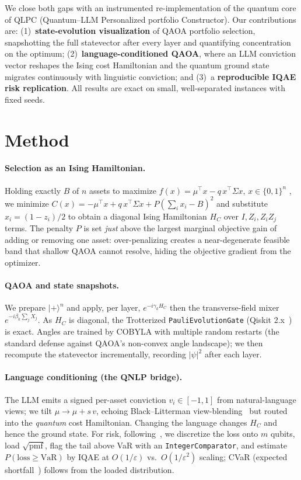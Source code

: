 \documentclass[runningheads]{llncs}
\begin{document}
We close both gaps with an instrumented re-implementation of the quantum core of QLPC (Quantum--LLM
Personalized portfolio Constructor). Our contributions are: (1)~\textbf{state-evolution visualization} of
QAOA portfolio selection, snapshotting the full statevector after every layer and quantifying
concentration on the optimum; (2)~\textbf{language-conditioned QAOA}, where an LLM conviction vector
reshapes the Ising cost Hamiltonian and the quantum ground state migrates continuously with linguistic
conviction; and (3)~a \textbf{reproducible IQAE risk replication}. All results are exact on small,
well-separated instances with fixed seeds.

\section{Method}
\paragraph{Selection as an Ising Hamiltonian.}
Holding exactly $B$ of $n$ assets to maximize $f(x)=\mu^\top x - q\,x^\top\Sigma x$, $x\in\{0,1\}^n$
\cite{markowitz1952}, we minimize $C(x) = -\mu^\top x + q\,x^\top \Sigma x + P(\sum_i x_i - B)^2$ and
substitute $x_i=(1-z_i)/2$ to obtain a diagonal Ising Hamiltonian $H_C$ over $I,Z_i,Z_iZ_j$ terms. The
penalty $P$ is set \emph{just} above the largest marginal objective gain of adding or removing one asset:
over-penalizing creates a near-degenerate feasible band that shallow QAOA cannot resolve, hiding the
objective gradient from the optimizer.

\paragraph{QAOA and state snapshots.}
We prepare $|+\rangle^{n}$ and apply, per layer, $e^{-i\gamma_k H_C}$ then the transverse-field mixer
$e^{-i\beta_k\sum_j X_j}$. As $H_C$ is diagonal, the Trotterized \texttt{PauliEvolutionGate} (Qiskit
2.x~\cite{qiskit2024}) is exact.
Angles are trained by COBYLA with multiple random restarts (the standard defense against QAOA's
non-convex angle landscape); we then recompute the statevector incrementally, recording $|\psi|^2$ after
each layer.

\paragraph{Language conditioning (the QNLP bridge).}
The LLM emits a signed per-asset conviction $v_i\in[-1,1]$ from natural-language views; we tilt
$\mu\to\mu+s\,v$, echoing Black--Litterman view-blending~\cite{black1992litterman} but routed into the
\emph{quantum} cost Hamiltonian. Changing the language changes $H_C$ and hence the ground state. For
risk, following~\cite{woerner2019risk,grant2021iqae}, we discretize the loss onto $m$ qubits, load
$\sqrt{\mathrm{pmf}}$, flag the tail above VaR with an \texttt{IntegerComparator}, and estimate
$P(\mathrm{loss}\ge\mathrm{VaR})$ by IQAE at $O(1/\varepsilon)$ vs.\ $O(1/\varepsilon^2)$ scaling;
CVaR (expected shortfall~\cite{rockafellar2000cvar}) follows from the loaded distribution.
\end{document}
